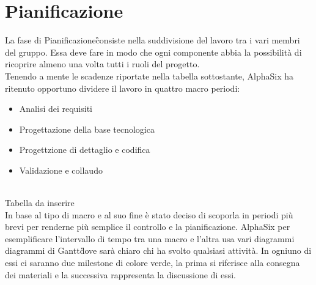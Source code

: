 \newpage
\section{Pianificazione}\label{Pianificazione}
    La fase di Pianificazione\G consiste nella suddivisione del lavoro tra i vari membri del gruppo. Essa deve fare in modo che ogni componente abbia la possibilità di ricoprire almeno una volta tutti i ruoli del progetto.\\
    Tenendo a mente le scadenze riportate nella tabella sottostante,
     AlphaSix ha ritenuto opportuno dividere il lavoro in quattro
     macro periodi:
     \begin{itemize}
		\item Analisi dei requisiti
		\item Progettazione della base tecnologica
		\item Progettzione di dettaglio e codifica
		\item Validazione e collaudo
     \end{itemize}
    \\
    Tabella da inserire\\
    
    In base al tipo di macro e al suo fine è stato deciso di scoporla in periodi più brevi per renderne più semplice il
    controllo e la pianificazione. AlphaSix per esemplificare l'intervallo di tempo tra una macro e l'altra usa vari diagrammi
    diagrammi di Gantt\G dove sarà chiaro chi ha svolto qualsiasi attività. In ogniuno di essi ci saranno due
    milestone di colore verde, la prima si riferisce alla consegna dei materiali e la successiva rappresenta la discussione di essi.

